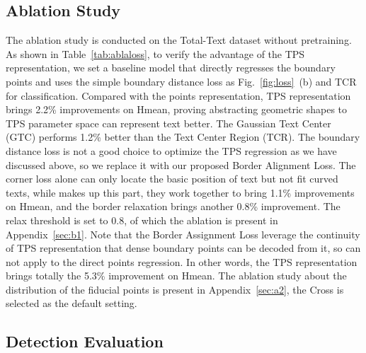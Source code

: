 \documentclass[sigconf]{acmart}
\begin{document}
	\subsection{Ablation Study}
The ablation study is conducted  on the Total-Text dataset without pretraining.
As shown in Table~\ref{tab:ablaloss}, to verify the advantage of the TPS representation, we set a baseline model that directly regresses the boundary points and uses the simple boundary distance loss  as Fig.~\ref{fig:loss}~(b) and TCR for classification.
Compared with the points representation, TPS representation brings 2.2\% improvements on Hmean, proving abstracting geometric shapes to TPS parameter space can represent text better. The Gaussian Text Center (GTC) performs 1.2\% better than the Text Center Region (TCR). The boundary distance loss  is not a good choice to optimize the TPS regression as we have discussed above, so we replace it with our proposed Border Alignment Loss. The corner loss  alone can only locate the basic position of text but not fit curved texts, while  makes up this part, they work together to bring 1.1\% improvements on Hmean, and the border relaxation brings another 0.8\% improvement. The relax threshold  is set to 0.8, of which the ablation is present in Appendix~\ref{sec:b1}. Note that the Border Assignment Loss leverage the continuity of TPS representation that dense boundary points can be decoded from it, so  can not apply to the direct points regression. In other words, the TPS representation brings totally the 5.3\% improvement on Hmean.
	The ablation study about the distribution of the fiducial points is present in Appendix~\ref{sec:a2}, the Cross is selected as the default setting.
	
	
	\subsection{
Detection Evaluation}
	
\end{document}
